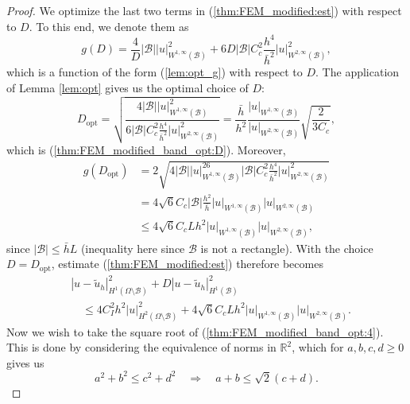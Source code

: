 \documentclass{article}
\theoremstyle{remark}
\def \IR {\mathbb{R}}
\def\B{\mathcal{B}}
\def\WIi{W^{1,\infty}}
\def\WIIi{W^{2,\infty}}
\def\tu{\tilde{u}}
\def\opt{\mathrm{opt}}
\def\width{\bar{h}}
\begin{document}
    \begin{proof}
    We optimize the last two terms in (\ref{thm:FEM_modified:est}) with respect to $D$. To this end, we denote them as
    \begin{equation*}
    \label{thm:FEM_modified_band_opt:1}
    g(D)= \frac{4}{D}|\B| |u|_{\WIi(\B)}^2 +6D|\B|C_c^2 \frac{h^4}{\width^2} |u|^2_{\WIIi(\B)},
    \end{equation*}
    which is a function of the form (\ref{lem:opt_g}) with respect to $D$. The application of Lemma \ref{lem:opt} gives us the optimal choice of $D$:
    \begin{equation*}
    \label{thm:FEM_modified_band_opt:2}
    D_\opt=\sqrt{\frac{4|\B| |u|_{\WIi(\B)}^2}{6|\B|C_c^2 \frac{h^4}{\width^2} |u|^2_{\WIIi(\B)}}} =\frac{\width}{h^2}\frac{|u|_{\WIi(\B)}}{|u|_{\WIIi(\B)}}\sqrt{\frac{2}{3C_c}},
    \end{equation*}
    which is (\ref{thm:FEM_modified_band_opt:D}). Moreover,
    \begin{equation*}
    \begin{split}
    \label{thm:FEM_modified_band_opt:3}
    g(D_\opt)&= 2\sqrt{4|\B| |u|_{\WIi(\B)}^26|\B|C_c^2 \frac{h^4}{\width^2} |u|^2_{\WIIi(\B)}}\\ &=4\sqrt{6}C_c|\B|\frac{h^2}{\width} |u|_{\WIi(\B)}|u|_{\WIIi(\B)}\\
    &\leq 4\sqrt{6}C_c L h^2 |u|_{\WIi(\B)}|u|_{\WIIi(\B)},
    \end{split}
    \end{equation*}
    since $|\B|\leq \width L$ (inequality here since $\B$ is not a rectangle). With the choice $D=D_\opt$, estimate (\ref{thm:FEM_modified:est}) therefore becomes
    \begin{equation}
    \begin{split}
    \label{thm:FEM_modified_band_opt:4}
    &|u-\tu_h|^2_{H^1(\Omega\setminus\B)} +D|u-\tu_h|^2_{H^1(\B)}\\
    &\quad\leq 4C_I^2h^2|u|^2_{H^2(\Omega\setminus\B)} + 4\sqrt{6}C_c L h^2 |u|_{\WIi(\B)}|u|_{\WIIi(\B)}.
    \end{split}
    \end{equation}
    Now we wish to take the square root of (\ref{thm:FEM_modified_band_opt:4}). This is done by considering the equivalence of norms in $\IR^2$, which for $a,b,c,d\ge 0$ gives us 
    \begin{equation}
    \label{thm:FEM_modified_band_opt:5}
    a^2+b^2\leq c^2+d^2 \quad\Longrightarrow\quad a+b\leq\sqrt{2}(c+d).
    \end{equation}

\end{proof}
\end{document}
